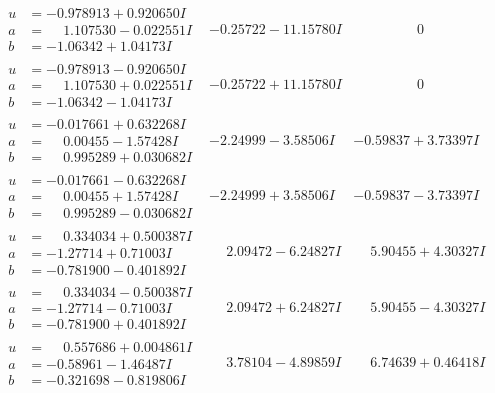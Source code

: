 \documentclass[1p]{elsarticle_modified}
\theoremstyle{definition}
\begin{document}
$$\begin{array}{c|c|c}
\begin{aligned}
u &= -0.978913 + 0.920650 I \\
a &= \phantom{-}1.107530 - 0.022551 I \\
b &= -1.06342 + 1.04173 I\end{aligned}
 & -0.25722 - 11.15780 I & \phantom{-0.000000 } 0 \\ \hline\begin{aligned}
u &= -0.978913 - 0.920650 I \\
a &= \phantom{-}1.107530 + 0.022551 I \\
b &= -1.06342 - 1.04173 I\end{aligned}
 & -0.25722 + 11.15780 I & \phantom{-0.000000 } 0 \\ \hline\begin{aligned}
u &= -0.017661 + 0.632268 I \\
a &= \phantom{-}0.00455 - 1.57428 I \\
b &= \phantom{-}0.995289 + 0.030682 I\end{aligned}
 & -2.24999 - 3.58506 I & -0.59837 + 3.73397 I \\ \hline\begin{aligned}
u &= -0.017661 - 0.632268 I \\
a &= \phantom{-}0.00455 + 1.57428 I \\
b &= \phantom{-}0.995289 - 0.030682 I\end{aligned}
 & -2.24999 + 3.58506 I & -0.59837 - 3.73397 I \\ \hline\begin{aligned}
u &= \phantom{-}0.334034 + 0.500387 I \\
a &= -1.27714 + 0.71003 I \\
b &= -0.781900 - 0.401892 I\end{aligned}
 & \phantom{-}2.09472 - 6.24827 I & \phantom{-}5.90455 + 4.30327 I \\ \hline\begin{aligned}
u &= \phantom{-}0.334034 - 0.500387 I \\
a &= -1.27714 - 0.71003 I \\
b &= -0.781900 + 0.401892 I\end{aligned}
 & \phantom{-}2.09472 + 6.24827 I & \phantom{-}5.90455 - 4.30327 I \\ \hline\begin{aligned}
u &= \phantom{-}0.557686 + 0.004861 I \\
a &= -0.58961 - 1.46487 I \\
b &= -0.321698 - 0.819806 I\end{aligned}
 & \phantom{-}3.78104 - 4.89859 I & \phantom{-}6.74639 + 0.46418 I \\ \hline\begin{aligned}

\end{aligned}
\end{array}$$
\end{document}
